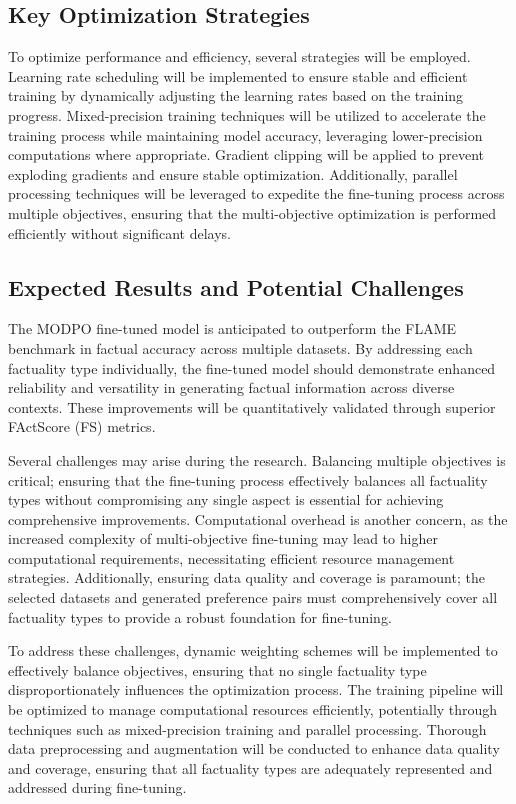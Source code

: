 \documentclass{article}
\begin{document}
\subsection{Key Optimization Strategies}
To optimize performance and efficiency, several strategies will be employed. Learning rate scheduling will be implemented to ensure stable and efficient training by dynamically adjusting the learning rates based on the training progress. Mixed-precision training techniques will be utilized to accelerate the training process while maintaining model accuracy, leveraging lower-precision computations where appropriate. Gradient clipping will be applied to prevent exploding gradients and ensure stable optimization. Additionally, parallel processing techniques will be leveraged to expedite the fine-tuning process across multiple objectives, ensuring that the multi-objective optimization is performed efficiently without significant delays.

\subsection{Expected Results and Potential Challenges}
The MODPO fine-tuned model is anticipated to outperform the FLAME benchmark in factual accuracy across multiple datasets. By addressing each factuality type individually, the fine-tuned model should demonstrate enhanced reliability and versatility in generating factual information across diverse contexts. These improvements will be quantitatively validated through superior FActScore (FS) metrics.

Several challenges may arise during the research. Balancing multiple objectives is critical; ensuring that the fine-tuning process effectively balances all factuality types without compromising any single aspect is essential for achieving comprehensive improvements. Computational overhead is another concern, as the increased complexity of multi-objective fine-tuning may lead to higher computational requirements, necessitating efficient resource management strategies. Additionally, ensuring data quality and coverage is paramount; the selected datasets and generated preference pairs must comprehensively cover all factuality types to provide a robust foundation for fine-tuning.

To address these challenges, dynamic weighting schemes will be implemented to effectively balance objectives, ensuring that no single factuality type disproportionately influences the optimization process. The training pipeline will be optimized to manage computational resources efficiently, potentially through techniques such as mixed-precision training and parallel processing. Thorough data preprocessing and augmentation will be conducted to enhance data quality and coverage, ensuring that all factuality types are adequately represented and addressed during fine-tuning.
\end{document}
